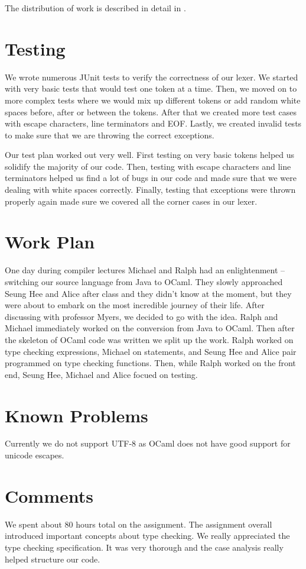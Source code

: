 \documentclass{hw}
\begin{document}
The distribution of work is described in detail in .

\section{Testing}\label{sec:testing}
We wrote numerous JUnit tests to verify the correctness of our lexer. We
started with very basic tests that would test one token at a time. Then, we
moved on to more complex tests where we would mix up different tokens or add
random white spaces before, after or between the tokens. After that we created
more test cases with escape characters, line terminators and EOF. Lastly, we
created invalid tests to make sure that we are throwing the correct exceptions.

Our test plan worked out very well. First testing on very basic tokens helped
us solidify the majority of our code. Then, testing with escape characters and
line terminators helped us find a lot of bugs in our code and made sure that we
were dealing with white spaces correctly.  Finally, testing that exceptions
were thrown properly again made sure we covered all the corner cases in our
lexer.

\section{Work Plan}\label{sec:workplan}
One day during compiler lectures Michael and Ralph had an enlightenment -- switching our
source language from Java to OCaml.
They slowly approached Seung Hee and Alice after class and they didn't know at the moment, 
but they were about to embark on the most incredible journey of their life. After discussing
with professor Myers, we decided to go with the idea. Ralph and Michael immediately 
worked on the conversion from Java to OCaml. Then after the skeleton of OCaml code was written
we split up the work. Ralph worked on type checking expressions, Michael on statements,
and Seung Hee and Alice pair programmed on type checking functions. Then, while 
Ralph worked on the front end, Seung Hee, Michael and Alice focued on testing.

\section{Known Problems}\label{sec:problems}
Currently we do not support UTF-8 as OCaml does not have good support for unicode 
escapes. 

\section{Comments}\label{sec:comments}
We spent about 80 hours total on the assignment. The assignment overall
introduced important concepts about type checking. We really appreciated 
the type checking specification. It was very thorough and the case analysis
really helped structure our code.
\end{document}
